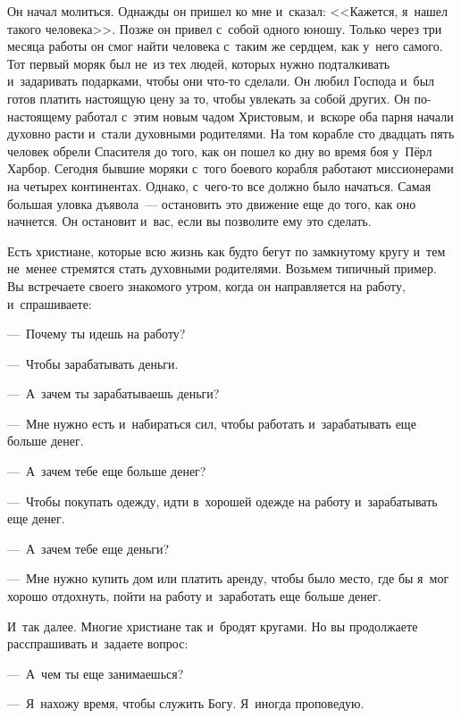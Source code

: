 \documentclass[12pt,article,a4paper,fittopage]{ncc}
\begin{document}
\begin{multicols}{2}
Он начал молиться. Однажды он пришел ко мне и~сказал: <<Кажется, я~нашел такого человека>>. Позже он привел с~собой одного юношу. Только через три месяца работы он смог найти человека с~таким же сердцем, как у~него самого. Тот первый моряк был не~из тех людей, которых нужно подталкивать и~задаривать подарками, чтобы они что-то сделали. Он любил Господа и~был готов платить настоящую цену за то, чтобы увлекать за собой других. Он по-настоящему работал с~этим новым чадом Христовым, и~вскоре оба парня начали духовно расти и~стали духовными родителями. На том корабле сто двадцать пять человек обрели Спасителя до того, как он пошел ко дну во время боя у~Пёрл Харбор. Сегодня бывшие моряки с~того боевого корабля работают миссионерами на четырех континентах. Однако, с~чего-то все должно было начаться. Самая большая уловка дъявола~--- остановить это движение  еще до того, как оно начнется. Он остановит и~вас, если вы позволите ему это сделать.

Есть христиане, которые всю жизнь как будто бегут по замкнутому кругу и~тем не~менее стремятся стать духовными родителями. Возьмем типичный пример. Вы встречаете своего знакомого утром, когда он направляется на работу, и~спрашиваете: 

---~Почему ты идешь на работу?

---~Чтобы зарабатывать деньги.

---~А~зачем ты зарабатываешь деньги?

---~Мне нужно есть и~набираться сил, чтобы работать и~зарабатывать еще больше денег.

---~А~зачем тебе еще больше денег?

---~Чтобы покупать одежду, идти в~хорошей одежде на работу и~зарабатывать еще денег.

---~А~зачем тебе еще деньги?

---~Мне нужно купить дом или платить аренду, чтобы было место, где бы я~мог хорошо отдохнуть, пойти на работу и~заработать еще больше денег.

И~так далее. Многие христиане так и~бродят кругами. Но вы продолжаете расспрашивать и~задаете вопрос:

---~А~чем ты еще занимаешься?

---~Я~нахожу время, чтобы служить Богу. Я~иногда проповедую. 

\pagestyle{lheadings}


\end{multicols}
\end{document}
